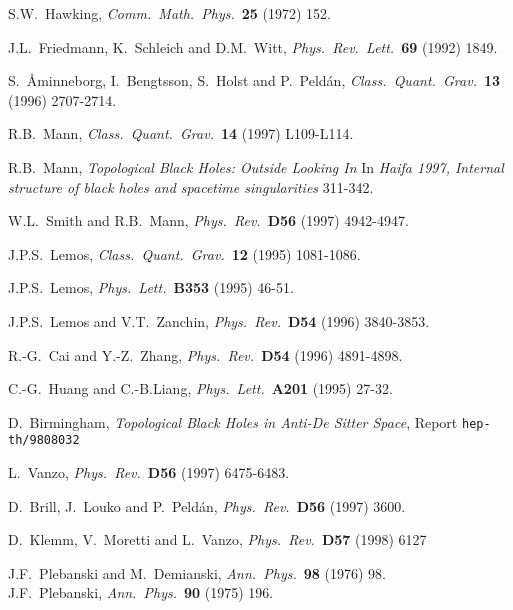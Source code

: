 \documentclass[12pt,a4paper]{article}
\begin{document}
\begin{thebibliography}{99}

 S.W.~Hawking,
                   {\it Comm.~Math.~Phys.}~{\bf 25} (1972) 152.

 J.L.~Friedmann, K.~Schleich and D.M.~Witt,
                  {\it Phys.~Rev.~Lett.}~{\bf 69} (1992) 1849.

 S.~\AA minneborg, I.~Bengtsson, S.~Holst 
                   and  P.~Peld\'an,
                   {\it Class.~Quant.~Grav.}~{\bf 13} (1996) 2707-2714.

 R.B.~Mann, 
                   {\it Class.~Quant.~Grav.}~{\bf 14} (1997) L109-L114.

 R.B.~Mann, 
                  {\sl Topological Black Holes: Outside Looking In}
                  In {\sl Haifa 1997, Internal structure of black holes 
                  and spacetime singularities} 311-342. 

 W.L.~Smith and R.B.~Mann,
                 {\it Phys.~Rev.}~{\bf D56} (1997) 4942-4947.

 J.P.S.~Lemos,
                  {\it  Class.~Quant.~Grav.}~{\bf 12} (1995) 1081-1086.

 J.P.S.~Lemos,
                  {\it Phys.~Lett.}~{\bf B353} (1995) 46-51. 

 J.P.S.~Lemos and V.T.~Zanchin,
                   {\it Phys.~Rev.}~{\bf D54} (1996) 3840-3853.

 R.-G.~Cai and  Y.-Z.~Zhang,
                   {\it Phys.~Rev.}~{\bf D54} (1996) 4891-4898.

 C.-G.~Huang and  C.-B.Liang,
                 {\it Phys.~Lett.}~{\bf A201} (1995) 27-32. 

 D.~Birmingham,
                 {\sl Topological Black Holes in Anti-De Sitter Space},
                 Report 
                 {\tt hep-th/9808032}

 L.~Vanzo,
                 {\it Phys.~Rev.}~{\bf D56} (1997) 6475-6483.

 D.~Brill, J.~Louko and P.~Peld\'an,
                  {\it Phys.~Rev.}~{\bf D56} (1997) 3600.

 D.~Klemm, V.~Moretti and L.~Vanzo,
                  {\it Phys.~Rev.}~{\bf D57} (1998) 6127

 J.F.~Plebanski and M.~Demianski,
                 {\it Ann.~Phys.}~{\bf 98} (1976) 98.\\
                 J.F.~Plebanski,
                 {\it Ann.~Phys.}~{\bf 90} (1975) 196.


\end{thebibliography}
\end{document}
